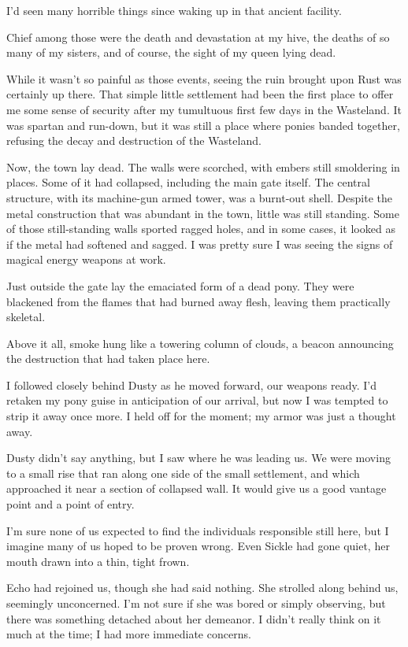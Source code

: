 I’d seen many horrible things since waking up in that ancient facility.

Chief among those were the death and devastation at my hive, the deaths of so many of my sisters, and of course, the sight of my queen lying dead.

While it wasn’t so painful as those events, seeing the ruin brought upon Rust was certainly up there. That simple little settlement had been the first place to offer me some sense of security after my tumultuous first few days in the Wasteland. It was spartan and run-down, but it was still a place where ponies banded together, refusing the decay and destruction of the Wasteland.

Now, the town lay dead. The walls were scorched, with embers still smoldering in places. Some of it had collapsed, including the main gate itself. The central structure, with its machine-gun armed tower, was a burnt-out shell. Despite the metal construction that was abundant in the town, little was still standing. Some of those still-standing walls sported ragged holes, and in some cases, it looked as if the metal had softened and sagged. I was pretty sure I was seeing the signs of magical energy weapons at work.

Just outside the gate lay the emaciated form of a dead pony. They were blackened from the flames that had burned away flesh, leaving them practically skeletal.

Above it all, smoke hung like a towering column of clouds, a beacon announcing the destruction that had taken place here.

I followed closely behind Dusty as he moved forward, our weapons ready. I’d retaken my pony guise in anticipation of our arrival, but now I was tempted to strip it away once more. I held off for the moment; my armor was just a thought away.

Dusty didn’t say anything, but I saw where he was leading us. We were moving to a small rise that ran along one side of the small settlement, and which approached it near a section of collapsed wall. It would give us a good vantage point and a point of entry.

I’m sure none of us expected to find the individuals responsible still here, but I imagine many of us hoped to be proven wrong. Even Sickle had gone quiet, her mouth drawn into a thin, tight frown.

Echo had rejoined us, though she had said nothing. She strolled along behind us, seemingly unconcerned. I’m not sure if she was bored or simply observing, but there was something detached about her demeanor. I didn’t really think on it much at the time; I had more immediate concerns.

